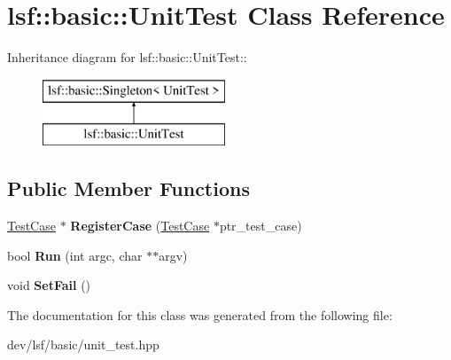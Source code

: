 \hypertarget{classlsf_1_1basic_1_1UnitTest}{
\section{lsf::basic::UnitTest Class Reference}
\label{classlsf_1_1basic_1_1UnitTest}
}
Inheritance diagram for lsf::basic::UnitTest::\begin{figure}[H]
\begin{center}
\leavevmode
\includegraphics[height=2cm]{classlsf_1_1basic_1_1UnitTest}
\end{center}
\end{figure}
\subsection*{Public Member Functions}
\begin{DoxyCompactItemize}
\item 
\hypertarget{classlsf_1_1basic_1_1UnitTest_a9df63e70701f549426fa3f96f93e5bd3}{
\hyperlink{classlsf_1_1basic_1_1TestCase}{TestCase} $\ast$ {\bfseries RegisterCase} (\hyperlink{classlsf_1_1basic_1_1TestCase}{TestCase} $\ast$ptr\_\-test\_\-case)}
\label{classlsf_1_1basic_1_1UnitTest_a9df63e70701f549426fa3f96f93e5bd3}

\item 
\hypertarget{classlsf_1_1basic_1_1UnitTest_ae761e8cde7af7f9b74ddb5268781ae30}{
bool {\bfseries Run} (int argc, char $\ast$$\ast$argv)}
\label{classlsf_1_1basic_1_1UnitTest_ae761e8cde7af7f9b74ddb5268781ae30}

\item 
\hypertarget{classlsf_1_1basic_1_1UnitTest_a99662c2d37ef2c7a12b25deb782921e3}{
void {\bfseries SetFail} ()}
\label{classlsf_1_1basic_1_1UnitTest_a99662c2d37ef2c7a12b25deb782921e3}

\end{DoxyCompactItemize}


The documentation for this class was generated from the following file:\begin{DoxyCompactItemize}
\item 
dev/lsf/basic/unit\_\-test.hpp\end{DoxyCompactItemize}
